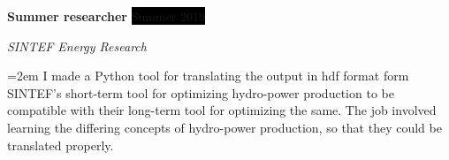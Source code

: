 \documentclass[paper=a4,fontsize=11pt,norsk]{scrartcl} %
\newcommand{\EducationEntry}[4]{
		\noindent \textbf{#1} \hfill      %
		\colorbox{Black}{%
			\parbox{6em}{%
			\hfill\color{White}#2}} \par  %
		\noindent \textit{#3} \par        %
		\noindent\hangindent=2em\hangafter=0 \small #4 %
		\normalsize \par}
\newcommand{\WorkEntry}[4]{				  %
		\noindent \textbf{#1} \hfill      %
		\colorbox{Black}{\color{White}#2} \par  %
		\noindent \textit{#3} \par              %
		\noindent\hangindent=2em\hangafter=0 \small #4 %
		\normalsize \par}
\begin{document}
\WorkEntry{Summer researcher}{Summer 2019}{SINTEF Energy Research} { I made a Python tool for translating the output in hdf format form SINTEF's short-term tool for optimizing hydro-power production to be compatible with their long-term tool for optimizing the same. The job involved learning the differing concepts of hydro-power production, so that they could be translated properly. }










\end{document}
